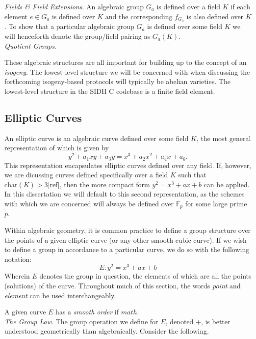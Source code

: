 \noindent
\emph{Fields \& Field Extensions}. An algebraic group $G_a$ is defined over a field $K$ if each element $e \in G_a$ is defined over $K$ and the corresponding $f_{G_a}$ is also defined over $K$. To show that a particular algebraic group $G_a$ is defined over some field $K$ we will henceforth denote the group/field pairing as $G_a(K)$.\\

\noindent
\emph{Quotient Groups}.

These algebraic structures are all important for building up to the concept of an \emph{isogeny}. The lowest-level structure we will be concerned with when discussing the forthcoming isogeny-based protocols will typically be abelian varieties. The lowest-level structure in the SIDH C codebase is a finite field element.\\

\subsection{Elliptic Curves}

An elliptic curve is an algebraic curve defined over some field $K$, the most general representation of which is given by
$$
y^2 + a_{1}xy + a_{3}y = x^3 + a_{2}x^2 + a_{4}x + a_6.
$$
This representation encapsulates elliptic curves defined over any field. If, however, we are dicussing curves defined specifically over a field $K$ such that $\text{char}(K) > 3$[ref], then the more compact form $y^2 = x^3 + ax + b$ can be applied. In this dissertation we will default to this second representation, as the schemes with which we are concerned will always be defined over $\mathbb{F}_p$ for some large prime $p$.

Within algebraic geometry, it is common practice to define a group structure over the points of a given elliptic curve (or any other smooth cubic curve). If we wish to define a group in accordance to a particular curve, we do so with the following notation:
$$
E: y^2 = x^3 + ax + b
$$
Wherein $E$ denotes the group in question, the elements of which are all the points (solutions) of the curve. Throughout much of this section, the words \emph{point} and \emph{element} can be used interchangeably.

A given curve $E$ has a \emph{smooth order} if $math$.\\

\noindent
\emph{The Group Law}. The group operation we define for $E$, denoted $+$, is better understood geometrically than algebraically. Consider the following.

